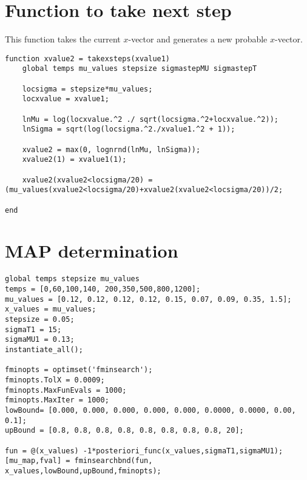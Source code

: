\section*{Function to take next step}
This function takes the current $x$-vector and generates a new probable $x$-vector.
\begin{lstlisting}
function xvalue2 = takexsteps(xvalue1)
	global temps mu_values stepsize sigmastepMU sigmastepT

	locsigma = stepsize*mu_values;
	locxvalue = xvalue1;

	lnMu = log(locxvalue.^2 ./ sqrt(locsigma.^2+locxvalue.^2));
	lnSigma = sqrt(log(locsigma.^2./xvalue1.^2 + 1));

	xvalue2 = max(0, lognrnd(lnMu, lnSigma));
	xvalue2(1) = xvalue1(1);

	xvalue2(xvalue2<locsigma/20) = (mu_values(xvalue2<locsigma/20)+xvalue2(xvalue2<locsigma/20))/2;

end
\end{lstlisting}

\section*{MAP determination}
\begin{lstlisting}
global temps stepsize mu_values
temps = [0,60,100,140, 200,350,500,800,1200];
mu_values = [0.12, 0.12, 0.12, 0.12, 0.15, 0.07, 0.09, 0.35, 1.5];
x_values = mu_values;
stepsize = 0.05;
sigmaT1 = 15;
sigmaMU1 = 0.13;
instantiate_all();

fminopts = optimset('fminsearch');
fminopts.TolX = 0.0009;
fminopts.MaxFunEvals = 1000;
fminopts.MaxIter = 1000;
lowBound= [0.000, 0.000, 0.000, 0.000, 0.000, 0.0000, 0.0000, 0.00, 0.1];
upBound = [0.8, 0.8, 0.8, 0.8, 0.8, 0.8, 0.8, 0.8, 20];

fun = @(x_values) -1*posteriori_func(x_values,sigmaT1,sigmaMU1);
[mu_map,fval] = fminsearchbnd(fun, x_values,lowBound,upBound,fminopts);
\end{lstlisting}